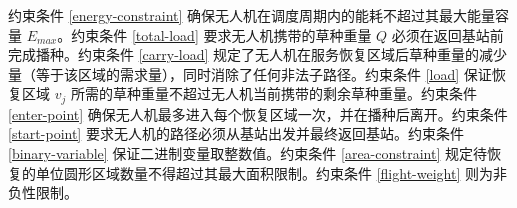 \documentclass[AutoFakeBold]{LZUThesis}
\begin{document}


约束条件 \eqref{energy-constraint} 确保无人机在调度周期内的能耗不超过其最大能量容量 $E_{max}$。约束条件 \eqref{total-load} 要求无人机携带的草种重量 $Q$ 必须在返回基站前完成播种。约束条件 \eqref{carry-load} 规定了无人机在服务恢复区域后草种重量的减少量（等于该区域的需求量），同时消除了任何非法子路径。约束条件 \eqref{load} 保证恢复区域 $v_j$ 所需的草种重量不超过无人机当前携带的剩余草种重量。约束条件 \eqref{enter-point} 确保无人机最多进入每个恢复区域一次，并在播种后离开。约束条件 \eqref{start-point} 要求无人机的路径必须从基站出发并最终返回基站。约束条件 \eqref{binary-variable} 保证二进制变量取整数值。约束条件 \eqref{area-constraint} 规定待恢复的单位圆形区域数量不得超过其最大面积限制。约束条件 \eqref{flight-weight} 则为非负性限制。
\end{document}
